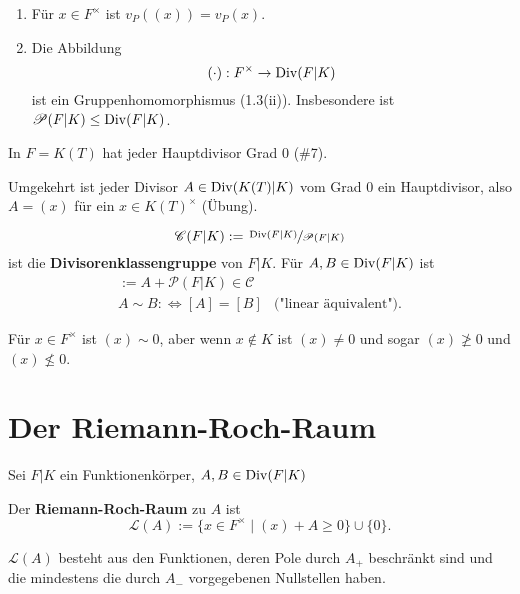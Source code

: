 \begin{bemerkungnr}
    \begin{enumerate}
        \item Für $x \in F^{\times}$ ist $v_P((x)) = v_P(x)$.
        \item Die Abbildung
        $$ (\cdot): F^{\times} \to \operatorname{Div}(F|K)$$
        ist ein Gruppenhomomorphismus (1.3(ii)). 
        Insbesondere ist $\mathscr{P}(F|K) \leq \operatorname{Div}(F|K)$.
    \end{enumerate}
\end{bemerkungnr}

\begin{beispiel}
    In $F=K(T)$ hat jeder Hauptdivisor Grad $0$ (\#7).

    Umgekehrt ist jeder Divisor $A \in \operatorname{Div}(K(T)|K)$ vom Grad $0$ ein Hauptdivisor, also
    $A = (x)$ für ein $x \in K(T)^{\times}$ (Übung).
\end{beispiel}

\begin{definition}
    $$ \mathscr{C}(F|K) := \sfrac{\operatorname{Div}(F|K)}{\mathscr{P}(F|K)}$$
    ist die \textbf{Divisorenklassengruppe} von $F|K$.
    Für $A,B \in \operatorname{Div}(F|K)$ ist
    \begin{align*}
        [A] := A + \mathscr{P}(F|K) \in \mathscr{C}\\
        A \sim B : \iff [A] = [B] & \text{("linear äquivalent")}.
    \end{align*}
\end{definition}

\begin{beispiel}
    Für $x \in F^{\times}$ ist $(x) \sim 0$, aber wenn $x \notin K$ ist $(x) \ne 0$ und sogar $(x) \not \geq 0$ und $(x) \not \leq 0$.
\end{beispiel}

\section{Der Riemann-Roch-Raum}
Sei $F|K$ ein Funktionenkörper, $A,B \in \operatorname{Div}(F|K)$

\begin{definition}
    Der \textbf{Riemann-Roch-Raum} zu $A$ ist 
    $$ \mathcal{L}(A) := \{x \in F^{\times} \mid (x) + A \geq 0\} \cup \{0\}.$$
\end{definition}

\begin{bemerkungnr}
    $\mathcal{L}(A)$ besteht aus den Funktionen, deren Pole durch $A_+$ beschränkt sind und die mindestens die
    durch $A_-$ vorgegebenen Nullstellen haben.
\end{bemerkungnr}

